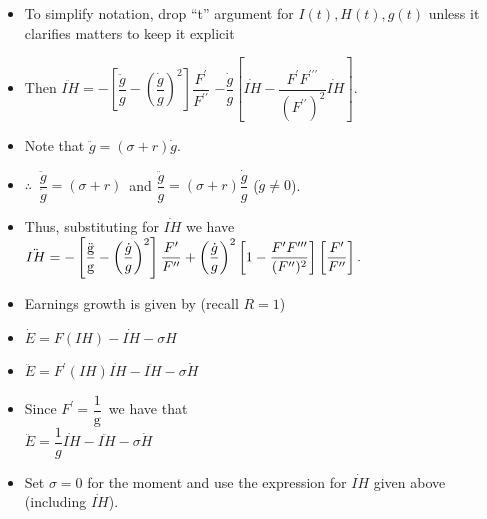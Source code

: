 \documentclass[12pt,compress,handout]{beamer}  %
\begin{document}
\begin{frame}
\begin{itemize}[<+->]
\item To simplify notation, drop ``t'' argument for $I(t),H(t),g(t)$ unless it
clarifies matters to keep it explicit
\item Then $\ddot{IH}=-\left[ \dfrac{\ddot{g}}{g}-\left( \dfrac{\dot{g
}}{g}\right) ^{2}\right] \dfrac{F^{\prime }}{F^{\prime \prime }}$
$-\dfrac{\dot{g}}{g}\left[ \dot{IH}-\dfrac{ F^{\prime }F^{\prime
\prime \prime }}{(F^{\prime \prime })^{2}}\dot{IH} \right] .$
\item Note that $\ddot{g} = (\sigma + r)\dot{g}$.
\item $\therefore $\ $\dfrac{\ddot{g}}{\dot{g}}=(\sigma +r)$\ and $\dfrac{\ddot{g}}{g}=(\sigma +r)\dfrac{\dot{g}}{g}$ ($\dot{g} \neq 0$).
\item Thus, substituting for $\dot{IH}$ we have\\\vspace{.2in} $\ddot{IH}=-\left[
\dfrac{\text{\"{g}}}{\text{g}}-\left( \dfrac{\dot{g}}{g}\right) ^{2}\right] \dfrac{F^{\prime }}{F^{\prime \prime }}+\left( \dfrac{%
\dot{g}}{g}\right) ^{2}\left[ 1-\dfrac{F^{\prime }F^{\prime \prime \prime }}{%
(F^{\prime \prime })^{2}}\right] \left[ \dfrac{F^{\prime
}}{F^{\prime \prime }}\right] .$
\end{itemize}
\end{frame}


\begin{frame}
\begin{itemize}[<+->]
\item Earnings growth is given by (recall $R = 1$)
\item $\dot{E}=F(IH)-\dot{IH}- \sigma H$\\
\item $\ddot{E}=F^{\prime }(IH)\dot{IH}-\ddot{IH}-\sigma \dot{H}$\\
\item Since $F^{\prime }\ $= $\dfrac{\text{1}}{\text{g}}$\ we have that\\
$\ddot{E} = \dfrac{1}{g}\dot{IH} - \ddot{IH} - \sigma \dot{H}$\\
\item Set $\sigma =0$ for the moment and use the expression for
$\dot{IH}$ given above (including $\dot{IH}$).
\end{itemize}
\end{frame}
\end{document}
